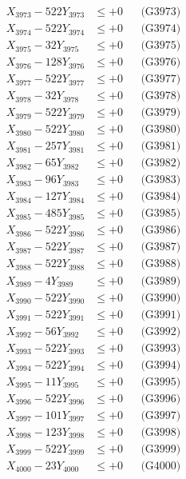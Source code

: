 \documentclass[a4paper,10pt]{article}
\begin{document}
{\begin{align}
X_{3973} - 522Y_{3973} &\leq +0 && \text{(G3973)} \\
X_{3974} - 522Y_{3974} &\leq +0 && \text{(G3974)} \\
X_{3975} - 32Y_{3975} &\leq +0 && \text{(G3975)} \\
X_{3976} - 128Y_{3976} &\leq +0 && \text{(G3976)} \\
X_{3977} - 522Y_{3977} &\leq +0 && \text{(G3977)} \\
X_{3978} - 32Y_{3978} &\leq +0 && \text{(G3978)} \\
X_{3979} - 522Y_{3979} &\leq +0 && \text{(G3979)} \\
X_{3980} - 522Y_{3980} &\leq +0 && \text{(G3980)} \\
\allowbreak
X_{3981} - 257Y_{3981} &\leq +0 && \text{(G3981)} \\
X_{3982} - 65Y_{3982} &\leq +0 && \text{(G3982)} \\
X_{3983} - 96Y_{3983} &\leq +0 && \text{(G3983)} \\
X_{3984} - 127Y_{3984} &\leq +0 && \text{(G3984)} \\
X_{3985} - 485Y_{3985} &\leq +0 && \text{(G3985)} \\
X_{3986} - 522Y_{3986} &\leq +0 && \text{(G3986)} \\
X_{3987} - 522Y_{3987} &\leq +0 && \text{(G3987)} \\
X_{3988} - 522Y_{3988} &\leq +0 && \text{(G3988)} \\
X_{3989} - 4Y_{3989} &\leq +0 && \text{(G3989)} \\
X_{3990} - 522Y_{3990} &\leq +0 && \text{(G3990)} \\
\allowbreak
X_{3991} - 522Y_{3991} &\leq +0 && \text{(G3991)} \\
X_{3992} - 56Y_{3992} &\leq +0 && \text{(G3992)} \\
X_{3993} - 522Y_{3993} &\leq +0 && \text{(G3993)} \\
X_{3994} - 522Y_{3994} &\leq +0 && \text{(G3994)} \\
X_{3995} - 11Y_{3995} &\leq +0 && \text{(G3995)} \\
X_{3996} - 522Y_{3996} &\leq +0 && \text{(G3996)} \\
X_{3997} - 101Y_{3997} &\leq +0 && \text{(G3997)} \\
X_{3998} - 123Y_{3998} &\leq +0 && \text{(G3998)} \\
X_{3999} - 522Y_{3999} &\leq +0 && \text{(G3999)} \\
X_{4000} - 23Y_{4000} &\leq +0 && \text{(G4000)} \\

\end{align}}
\end{document}
